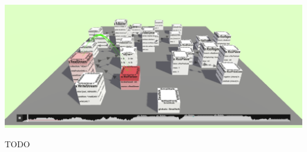\documentclass[sigconf,natbib=false,nonacm,screen]{acmart}
\begin{document}

\begin{teaserfigure}
	\includegraphics[width=\textwidth]{trace4d}
	\caption{TODO}
	\label{fig:teaser}
\end{teaserfigure}

\maketitle











\printbibliography

\end{document}
